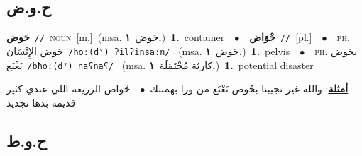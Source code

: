 \documentclass[10pt,a4paper,twoside]{article} %
\begin{document}
\begin{multicols}{2}
\vspace{-3mm}
\subsection*{\color{blue}\foreignlanguage{arabic}{ح.و.ض}\color{blue}{}} 

{\setlength\topsep{0pt}\textbf{\foreignlanguage{arabic}{حَوض}}\ {\color{gray}\texttt{//}\color{black}}\ \textsc{noun}\ [m.]\ \color{gray}(msa. \foreignlanguage{arabic}{حَوض}~\foreignlanguage{arabic}{\textbf{١.}})\color{black}\ \textbf{1.}~container\ \ $\bullet$\ \ \setlength\topsep{0pt}\textbf{\foreignlanguage{arabic}{حْوَاض}}\ {\color{gray}\texttt{//}\color{black}}\ [pl.]\ \ $\bullet$\ \ \textsc{ph.} \color{gray} \foreignlanguage{arabic}{حَوض الإِنْسَان}\color{black}\ {\color{gray}\texttt{/{\sffamily ħoː(dˤ) ʔilʔinsaːn}/}\color{black}}\ \color{gray} (msa. \foreignlanguage{arabic}{حَوض}~\foreignlanguage{arabic}{\textbf{١.}})\color{black}\ \textbf{1.}~pelvis\ \ $\bullet$\ \ \textsc{ph.} \color{gray} \foreignlanguage{arabic}{بحَوض نَعْنَع}\color{black}\ {\color{gray}\texttt{/{\sffamily bħoː(dˤ) naʕnaʕ}/}\color{black}}\ \color{gray} (msa. \foreignlanguage{arabic}{كارثة مُحْتَمَلَة}~\foreignlanguage{arabic}{\textbf{١.}})\color{black}\ \textbf{1.}~potential disaster\  \begin{flushright}\color{gray}\foreignlanguage{arabic}{\textbf{\underline{\foreignlanguage{arabic}{أمثلة}}}: والله غير تجيبنا بحُوض نَعْنَع من ورا بهمنتك\ $\bullet$\ \  حْواض الزريعة اللي عندي كثير قديمة بدها تجديد}\end{flushright}\color{black}} \vspace{2mm}

\vspace{-3mm}
\subsection*{\color{blue}\foreignlanguage{arabic}{ح.و.ط}\color{blue}{}} 


\end{multicols}
\end{document}
